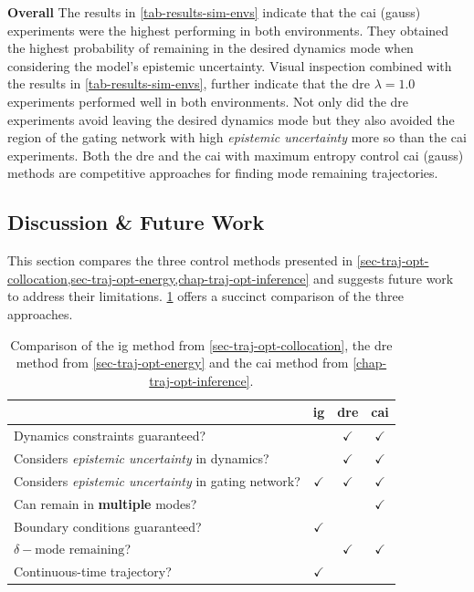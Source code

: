 \documentclass{mimosis-class/mimosis}
\numberwithin{equation}{chapter}
\begin{document}
{\textbf{Overall}
The results in \cref{tab-results-sim-envs} indicate that the \acrshort{cai} (gauss) experiments were the highest performing
in both environments.
They obtained the highest probability of remaining in the desired dynamics mode when considering the model's epistemic
uncertainty.
Visual inspection combined with the results in \cref{tab-results-sim-envs}, further
indicate that the \acrshort{dre} \(\lambda=1.0\) experiments performed well in both environments.
Not only did the \acrshort{dre} experiments avoid leaving the desired dynamics mode but they also avoided the region
of the gating network with high \emph{epistemic uncertainty} more so than the \acrshort{cai} experiments.
Both the \acrfull{dre} and the \acrfull{cai} with maximum entropy control
\acrshort{cai} (gauss) methods are competitive approaches for finding mode remaining trajectories.

\subsection{Discussion \& Future Work}
\label{sec:org279ce6c}
This section compares the three control methods presented in
\cref{sec-traj-opt-collocation,sec-traj-opt-energy,chap-traj-opt-inference}
and suggests future work to address their limitations.
\cref{tab-geometry-control-comparison} offers a succinct comparison of the three approaches.


\begin{table}
\caption[Comparison of mode remaining trajectory optimisation algorithms]{Comparison of the \acrfull{ig} method from \cref{sec-traj-opt-collocation}, the \acrfull{dre} method from \cref{sec-traj-opt-energy} and the \acrfull{cai} method from \cref{chap-traj-opt-inference}.}
\label{tab-geometry-control-comparison}
\begin{center}
\begin{tabular}{lccc}
 & \acrshort{ig} & \acrshort{dre} & \acrshort{cai}\\
\hline
Dynamics constraints guaranteed? & \texttimes{} & \(\checkmark\) & \(\checkmark\)\\
Considers \emph{epistemic uncertainty} in dynamics? & \texttimes{} & \(\checkmark\) & \(\checkmark\)\\
Considers \emph{epistemic uncertainty} in gating network? & \(\checkmark\) & \(\checkmark\) & \(\checkmark\)\\
Can remain in \textbf{multiple} modes? & \texttimes{} & \texttimes{} & \(\checkmark\)\\
Boundary conditions guaranteed? & \(\checkmark\) & \texttimes{} & \texttimes{}\\
\(\delta-\text{mode remaining}\)? & \texttimes{} & \(\checkmark\) & \(\checkmark\)\\
Continuous-time trajectory? & \(\checkmark\) & \texttimes{} & \texttimes{}\\
\end{tabular}
\end{center}
\end{table}

}
\end{document}

